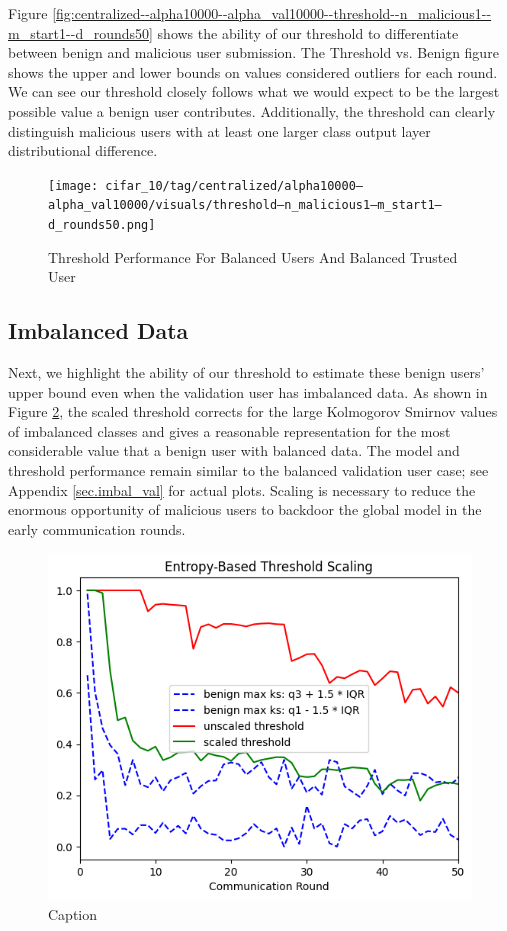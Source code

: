 \documentclass{article} %
\begin{document}
Figure \ref{fig:centralized--alpha10000--alpha_val10000--threshold--n_malicious1--m_start1--d_rounds50} shows the ability of our threshold to differentiate between benign and malicious user submission. The Threshold vs. Benign figure shows the upper and lower bounds on values considered outliers for each round. We can see our threshold closely follows what we would expect to be the largest possible value a benign user contributes. Additionally, the threshold can clearly distinguish malicious users with at least one larger class output layer distributional difference. 

\begin{figure}[H]
    \centering
    \texttt{[image: cifar\_10/tag/centralized/alpha10000--alpha\_val10000/visuals/threshold--n\_malicious1--m\_start1--d\_rounds50.png]}
    \caption{Threshold Performance For Balanced Users And Balanced Trusted User}
    \label{fig:centralized--balanced--threshold}
\end{figure}

%
\subsection{Imbalanced Data}

Next, we highlight the ability of our threshold to estimate these benign users' upper bound even when the validation user has imbalanced data. As shown in Figure \ref{fig:centralized--alpha10000--alpha_val1--scaling--d_rounds50.png}, the scaled threshold corrects for the large Kolmogorov Smirnov values of imbalanced classes and gives a reasonable representation for the most considerable value that a benign user with balanced data. The model and threshold performance remain similar to the balanced validation user case; see Appendix \ref{sec.imbal_val} for actual plots. Scaling is necessary to reduce the enormous opportunity of malicious users to backdoor the global model in the early communication rounds.

\begin{figure}[H]
    \centering
    \includegraphics[width=.5\textwidth]{01_trusted/centralized/alpha10000--alpha_val1/visuals/scaling--n_malicious1--m_start1--d_rounds50.png}
    \caption{Caption}
    \label{fig:centralized--alpha10000--alpha_val1--scaling--d_rounds50.png}
\end{figure}
\end{document}
